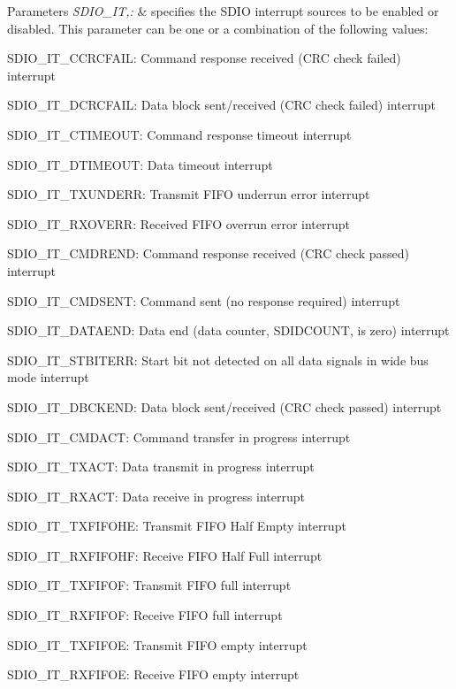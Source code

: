\begin{DoxyParams}{Parameters}
{\em S\-D\-I\-O\-\_\-\-I\-T,\-:} & specifies the S\-D\-I\-O interrupt sources to be enabled or disabled. This parameter can be one or a combination of the following values\-: \begin{DoxyItemize}
\item S\-D\-I\-O\-\_\-\-I\-T\-\_\-\-C\-C\-R\-C\-F\-A\-I\-L\-: Command response received (C\-R\-C check failed) interrupt \item S\-D\-I\-O\-\_\-\-I\-T\-\_\-\-D\-C\-R\-C\-F\-A\-I\-L\-: Data block sent/received (C\-R\-C check failed) interrupt \item S\-D\-I\-O\-\_\-\-I\-T\-\_\-\-C\-T\-I\-M\-E\-O\-U\-T\-: Command response timeout interrupt \item S\-D\-I\-O\-\_\-\-I\-T\-\_\-\-D\-T\-I\-M\-E\-O\-U\-T\-: Data timeout interrupt \item S\-D\-I\-O\-\_\-\-I\-T\-\_\-\-T\-X\-U\-N\-D\-E\-R\-R\-: Transmit F\-I\-F\-O underrun error interrupt \item S\-D\-I\-O\-\_\-\-I\-T\-\_\-\-R\-X\-O\-V\-E\-R\-R\-: Received F\-I\-F\-O overrun error interrupt \item S\-D\-I\-O\-\_\-\-I\-T\-\_\-\-C\-M\-D\-R\-E\-N\-D\-: Command response received (C\-R\-C check passed) interrupt \item S\-D\-I\-O\-\_\-\-I\-T\-\_\-\-C\-M\-D\-S\-E\-N\-T\-: Command sent (no response required) interrupt \item S\-D\-I\-O\-\_\-\-I\-T\-\_\-\-D\-A\-T\-A\-E\-N\-D\-: Data end (data counter, S\-D\-I\-D\-C\-O\-U\-N\-T, is zero) interrupt \item S\-D\-I\-O\-\_\-\-I\-T\-\_\-\-S\-T\-B\-I\-T\-E\-R\-R\-: Start bit not detected on all data signals in wide bus mode interrupt \item S\-D\-I\-O\-\_\-\-I\-T\-\_\-\-D\-B\-C\-K\-E\-N\-D\-: Data block sent/received (C\-R\-C check passed) interrupt \item S\-D\-I\-O\-\_\-\-I\-T\-\_\-\-C\-M\-D\-A\-C\-T\-: Command transfer in progress interrupt \item S\-D\-I\-O\-\_\-\-I\-T\-\_\-\-T\-X\-A\-C\-T\-: Data transmit in progress interrupt \item S\-D\-I\-O\-\_\-\-I\-T\-\_\-\-R\-X\-A\-C\-T\-: Data receive in progress interrupt \item S\-D\-I\-O\-\_\-\-I\-T\-\_\-\-T\-X\-F\-I\-F\-O\-H\-E\-: Transmit F\-I\-F\-O Half Empty interrupt \item S\-D\-I\-O\-\_\-\-I\-T\-\_\-\-R\-X\-F\-I\-F\-O\-H\-F\-: Receive F\-I\-F\-O Half Full interrupt \item S\-D\-I\-O\-\_\-\-I\-T\-\_\-\-T\-X\-F\-I\-F\-O\-F\-: Transmit F\-I\-F\-O full interrupt \item S\-D\-I\-O\-\_\-\-I\-T\-\_\-\-R\-X\-F\-I\-F\-O\-F\-: Receive F\-I\-F\-O full interrupt \item S\-D\-I\-O\-\_\-\-I\-T\-\_\-\-T\-X\-F\-I\-F\-O\-E\-: Transmit F\-I\-F\-O empty interrupt \item S\-D\-I\-O\-\_\-\-I\-T\-\_\-\-R\-X\-F\-I\-F\-O\-E\-: Receive F\-I\-F\-O empty interrupt \item 
\end{DoxyItemize}
\end{DoxyParams}
